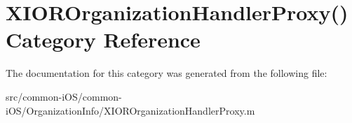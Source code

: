 \hypertarget{category_x_i_o_r_organization_handler_proxy_07_08}{}\section{X\+I\+O\+R\+Organization\+Handler\+Proxy() Category Reference}
\label{category_x_i_o_r_organization_handler_proxy_07_08}


The documentation for this category was generated from the following file\+:\begin{DoxyCompactItemize}
\item 
src/common-\/i\+O\+S/common-\/i\+O\+S/\+Organization\+Info/X\+I\+O\+R\+Organization\+Handler\+Proxy.\+m\end{DoxyCompactItemize}
